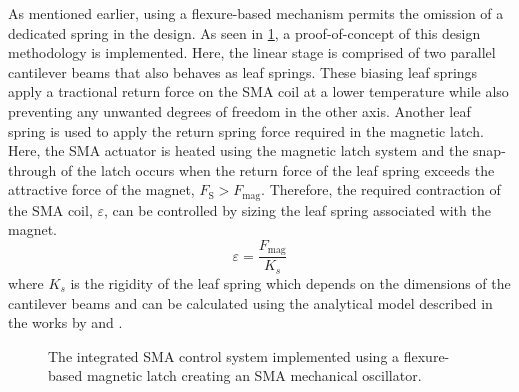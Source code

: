 As mentioned earlier, using a flexure-based mechanism permits the omission of a dedicated spring in the design. As seen in \cref{fig:proto-full}, a proof-of-concept of this design methodology is implemented. Here, the linear stage is comprised of two parallel cantilever beams that also behaves as leaf springs. These biasing leaf springs apply a tractional return force on the SMA coil at a lower temperature while also preventing any unwanted degrees of freedom in the other axis. Another leaf spring is used to apply the return spring force required in the magnetic latch. Here, the SMA actuator is heated using the magnetic latch system and the snap-through of the latch occurs when the return force of the leaf spring exceeds the attractive force of the magnet, $F_\textrm{S}>F_\textrm{mag}$. Therefore, the required contraction of the SMA coil, $\varepsilon$, can be controlled by sizing the leaf spring associated with the magnet.
\begin{equation}\label{eq:osc-stroke-sizing}
    \varepsilon = \frac{F_\textrm{mag}}{K_s}
\end{equation}
where $K_s$ is the rigidity of the leaf spring which depends on the dimensions of the cantilever beams and can be calculated using the analytical model described in the works by \cite{rubbertIsotropicSpringsBased2016} and \cite{heneinParallelSpringStages1998}.

\begin{figure}[ht] %
  \centering
  \caption{The integrated SMA control system implemented using a flexure-based magnetic latch creating an SMA mechanical oscillator.}
  \label{fig:proto-full}
\end{figure}

